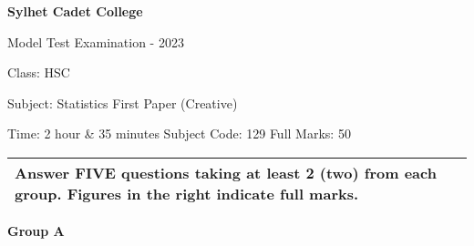 \documentclass{article}
\begin{document}
\begin{center}
  \bfseries\large
  Sylhet Cadet College

\normalsize
  Model Test Examination - 2023

  Class: HSC

  Subject: Statistics First Paper (Creative)

  Time: 2 hour \& 35 minutes \qquad \qquad \qquad Subject Code: 129  \qquad  \qquad \qquad Full Marks: 50

\end{center}

\noindent
\begin{tabular}{p{\dimexpr\linewidth-2\tabcolsep}}
  Answer FIVE questions taking at least 2 (two) from each group. Figures in the right indicate full marks.\\
  \hline
\end{tabular}

\begin{center}
\textbf{Group A}
\end{center}
\end{document}

